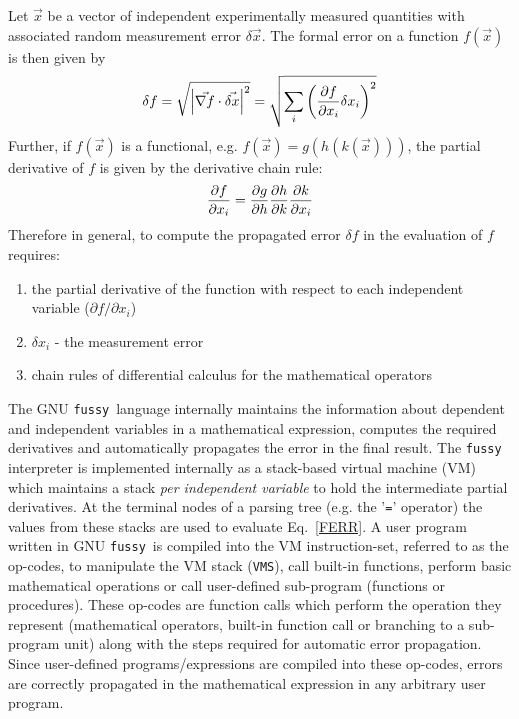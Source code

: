 \documentclass[11pt]{article}
\newcommand{\Fussy}{GNU {\tt fussy}}
\newcommand{\VMS}{{\tt VMS}}
\begin{document}
Let $\vec x$ be a vector of independent experimentally measured
quantities with associated random measurement error  $\delta \vec
x$.  The formal error on a function $f(\vec x)$ is then given by
\begin{equation}
  \delta f = \sqrt{\left| \vec{\nabla f} \cdot \vec{\delta x}\right|^2} = \sqrt{\sum_i {\left( {\partial f \over {\partial x_i}} 
        \delta x_i \right)}^2}
\label{FERR}
\end{equation}
Further, if $f(\vec x)$ is a functional, e.g. $f(\vec x)=g(h(k(\vec
x)))$, the partial derivative of $f$ is given by the derivative
chain rule:
\begin{equation}
{\partial f \over \partial x_i} = {\partial g \over \partial h} 
{\partial h \over \partial k} {\partial k \over \partial x_i}
\label{DFUNCTIONAL}
\end{equation}
Therefore in general, to compute the propagated error $\delta f$ in the evaluation of $f$
requires:
\begin{enumerate}
\item the partial derivative of the function with respect to each
independent variable ($\partial f / \partial x_i$)
\item $\delta x_i$ - the measurement error
\item chain rules of differential calculus for the
mathematical operators 
\end{enumerate}


The \Fussy\ language internally maintains the information about dependent and independent
variables in a mathematical expression, computes the required derivatives and
automatically propagates the error in the final result.  The {\tt fussy} interpreter is
implemented internally as a stack-based virtual machine (VM) which maintains a stack
{\it per independent variable} to hold the intermediate partial derivatives.  At the
terminal nodes of a parsing tree (e.g.  the '{\tt =}' operator) the values from these
stacks are used to evaluate Eq.~\ref{FERR}.  A user program written in \Fussy\ is
compiled into the VM instruction-set, referred to as the op-codes, to manipulate the VM
stack (\VMS), call built-in functions, perform basic mathematical operations or call
user-defined sub-program (functions or procedures).  These op-codes are function calls
which perform the operation they represent (mathematical operators, built-in function
call or branching to a sub-program unit) along with the steps required for automatic
error propagation.  Since user-defined programs/expressions are compiled into these
op-codes, errors are correctly propagated in the mathematical expression in any arbitrary
user program.
\end{document}

